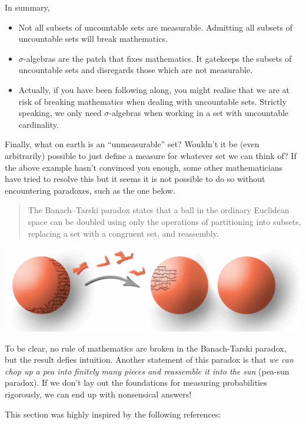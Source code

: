 \documentclass[
]{book}
\providecommand{\tightlist}{%
  \setlength{\itemsep}{0pt}\setlength{\parskip}{0pt}}
\theoremstyle{definition}
\theoremstyle{definition}
\theoremstyle{definition}
\theoremstyle{definition}
\theoremstyle{remark}
\begin{document}
In summary,

\begin{itemize}
\tightlist
\item
  Not all subsets of uncountable sets are measurable. Admitting all subsets of uncountable sets will break mathematics.
\item
  \(\sigma\)-algebras are the patch that fixes mathematics. It gatekeeps the subsets of uncountable sets and disregards those which are not measurable.
\item
  Actually, if you have been following along, you might realise that we are at risk of breaking mathematics when dealing with uncountable sets. Strictly speaking, we only need \(\sigma\)-algebras when working in a set with uncountable cardinality.
\end{itemize}

Finally, what on earth is an ``unmeasurable'' set? Wouldn't it be (even arbitrarily) possible to just define a measure for whatever set we can think of? If the above example hasn't convinced you enough, some other mathematicians have tried to resolve this but it seems it is not possible to do so without encountering paradoxes, such as the one below.

\begin{quote}
The Banach--Tarski paradox states that a ball in the ordinary Euclidean space can be doubled using only the operations of partitioning into subsets, replacing a set with a congruent set, and reassembly.
\end{quote}

\includegraphics{figure/banach_tarski.png}

To be clear, no rule of mathematics are broken in the Banach-Tarski paradox, but the result defies intuition. Another statement of this paradox is that \emph{we can chop up a pea into finitely many pieces and reassemble it into the sun} (pea-sun paradox). If we don't lay out the foundations for measuring probabilities rigorously, we can end up with nonsensical answers!

This section was highly inspired by the following references:
\end{document}
